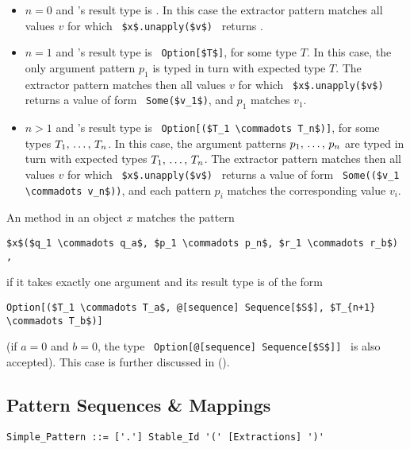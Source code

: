 \begin{itemize}
  \item[] $n = 0$ and 's result type is . In this case the extractor pattern matches all values $v$ for which ~\lstinline!$x$.unapply($v$)!~ returns . 
  
  \item[] $n = 1$ and 's result type is ~\lstinline!Option[$T$]!, for some type $T$. In this case, the only argument pattern $p_1$ is typed in turn with expected type $T$. The extractor pattern matches then all values $v$ for which ~\lstinline!$x$.unapply($v$)!~ returns a value of form ~\lstinline!Some($v_1$)!, and $p_1$ matches $v_1$. 

  \item[] $n > 1$ and 's result type is ~\lstinline!Option[($T_1 \commadots T_n$)]!, for some types $T_1 ,\, \ldots ,\, T_n$. In this case, the argument patterns $p_1 ,\, \ldots ,\, p_n$ are typed in turn with expected types $T_1 ,\, \ldots ,\, T_n$. The extractor pattern matches then all values $v$ for which ~\lstinline!$x$.unapply($v$)!~ returns a value of form ~\lstinline!Some(($v_1 \commadots v_n$))!, and each pattern $p_i$ matches the corresponding value $v_i$.
  
\end{itemize}

An  method in an object $x$ matches the pattern 
\begin{lstlisting}
$x$($q_1 \commadots q_a$, $p_1 \commadots p_n$, $r_1 \commadots r_b$)  ,
\end{lstlisting}
if it takes exactly one argument and its result type is of the form 
\begin{lstlisting}
Option[($T_1 \commadots T_a$, @[sequence] Sequence[$S$], $T_{n+1} \commadots T_b$)]
\end{lstlisting}
(if $a = 0$ and $b = 0$, the type ~\lstinline!Option[@[sequence] Sequence[$S$]]!~ is also accepted). This case is further discussed in ().





\subsection{Pattern Sequences \& Mappings}
\label{sec:pattern-sequences}

\syntax\begin{lstlisting}
Simple_Pattern ::= ['.'] Stable_Id '(' [Extractions] ')'
\end{lstlisting}

